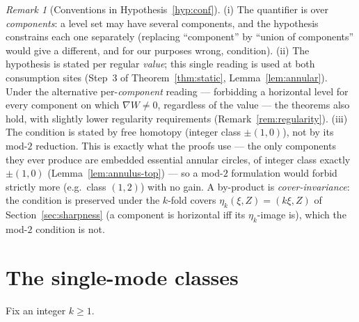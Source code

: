 \documentclass[11pt]{amsart}
\theoremstyle{definition}
\theoremstyle{remark}
\newtheorem{remark}[theorem]{Remark}
\begin{document}
\begin{remark}[Conventions in Hypothesis~\ref{hyp:conf}]
\label{rem:conventions}
(i) The quantifier is over \emph{components}: a level set may have
several components, and the hypothesis constrains each one separately
(replacing ``component'' by ``union of components'' would give a
different, and for our purposes wrong, condition). (ii) The hypothesis
is stated per regular \emph{value}; this single reading is used at both
consumption sites (Step~3 of Theorem~\ref{thm:static},
Lemma~\ref{lem:annular}). Under the alternative per-\emph{component}
reading --- forbidding a horizontal level for every component on which
$\nabla W\neq0$, regardless of the value --- the theorems also hold,
with slightly lower regularity requirements
(Remark~\ref{rem:regularity}). (iii) The condition is stated by free
homotopy (integer class $\pm(1,0)$), not by its mod-$2$ reduction. This
is exactly what the proofs use --- the only components they ever produce
are embedded essential annular circles, of integer class exactly
$\pm(1,0)$ (Lemma~\ref{lem:annulus-top}) --- so a mod-$2$ formulation
would forbid strictly more (e.g.\ class $(1,2)$) with no gain. A
by-product is \emph{cover-invariance}: the condition is preserved under
the $k$-fold covers $\eta_k(\xi,Z)=(k\xi,Z)$ of
Section~\ref{sec:sharpness} (a component is horizontal iff its
$\eta_k$-image is), which the mod-$2$ condition is not.
\end{remark}

\section{The single-mode classes}\label{sec:class}

Fix an integer $k\ge1$.
\end{document}
